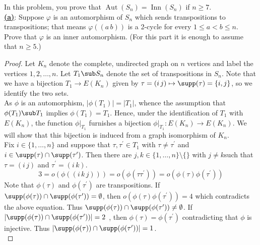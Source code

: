 \documentclass[12pt]{article}
\begin{document}
\begin{homeworkProblem}
  In this problem, you prove that $\operatorname{Aut}(S_n) = \operatorname{Inn}(S_n)$ if $n \ge 7$.\\

  \underline{\textbf{(a)}}: Suppose $\varphi$ is an automorphism of $S_n$ which sends transpositions to transpositions; that means $\varphi((a\, b))$ is a 2-cycle for every $1 \le a < b \le n$.  
  Prove that $\varphi$ is an inner automorphism. (For this part it is enough to assume that $n \ge 5$.)\\

  \begin{proof}
    Let $ K_{n} $ denote the complete, undirected graph on $ n $ vertices and label the vertices $ 1,2,\ldots, n $. Let $ T_{1}\sub S_{n} $ denote the set of transpositions in $ S_{n} $. Note that we have a bijection $ T_{1}\to E(K_{n}) $ given by $ \tau=(i\,j ) \mapsto \supp(\tau) = \{i,j\}$, so we identify the two sets.\\

    As $ \phi $ is an automorphism, $ | \phi(T_{1})| = |T_{1}| $, whence the assumption that $ \phi(T_{1})\sub T_{1} $ implies $ \phi(T_{1}) = T_{1} $. Hence, under the identification of $ T_{1} $ with $ E(K_{n}) $, the function $ \phi\vert_{T_{1}} $ furnishes a bijection $ \phi\vert_{T_{1}}: E(K_{n})\to E(K_{n}) $. We will show that this bijection is induced from a graph isomorphism of $ K_{n} $.\\
  

    
    Fix $ i\in \{1,\ldots,n\} $ and suppose that $ \tau, \tau^{\prime}\in T_{1} $ with $ \tau\neq \tau^{\prime} $ and $ i\in \supp(\tau)\cap \supp(\tau^{\prime}) $. Then there are $ j,k \in \{1,\ldots,n\}\setminus\{\} $ with $ j\neq k $such that $ \tau = (i\, j ) $ and $ \tau^{\prime} = (i\, k) $. 
    \[
       3 = o(\phi((i\,k\,j))) =  o(\phi(\tau \tau^{\prime})) = o(\phi(\tau) \phi(\tau^{\prime}))
    \]
    Note that $ \phi(\tau) $ and $ \phi(\tau^{\prime}) $ are transpositions. If $ \supp(\phi(\tau))\cap \supp(\phi(\tau^{\prime})) = \emptyset $, then $ o(\phi(\tau) \phi(\tau^{\prime})) = 4 $ which contradicts the above equation. Thus $ \supp(\phi(\tau))\cap \supp(\phi(\tau^{\prime})) \neq \emptyset$. If $ |\supp(\phi(\tau))\cap \supp(\phi(\tau^{\prime}))| = 2 $ , then $ \phi(\tau) = \phi(\tau^{\prime}) $ contradicting that $ \phi $ is injective. Thus $ |\supp(\phi(\tau))\cap \supp(\phi(\tau^{\prime}))| = 1 $. \\


\end{proof}
\end{homeworkProblem}
\end{document}
